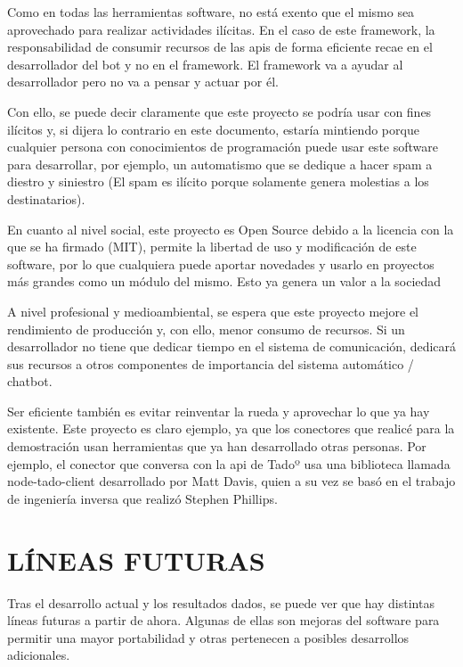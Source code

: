 \documentclass[spanish,12pt, a4paper, twoside]{paper}
\let\oldsection\section
\def\section{\cleardoublepage\oldsection}
\begin{document}
Como en todas las herramientas software, no está exento que el mismo sea aprovechado para realizar actividades ilícitas. En el caso de este framework, la responsabilidad de consumir recursos de las apis de forma eficiente recae en el desarrollador del bot y no en el framework. El framework va a ayudar al desarrollador pero no va a pensar y actuar por él.
\newline

Con ello, se puede decir claramente que este proyecto se podría usar con fines ilícitos y, si dijera lo contrario en este documento, estaría mintiendo porque cualquier persona con conocimientos de programación puede usar este software para desarrollar, por ejemplo, un automatismo que se dedique a hacer spam a diestro y siniestro (El spam es ilícito porque solamente genera molestias a los destinatarios).
\newline

En cuanto al nivel social, este proyecto es Open Source debido a la licencia con la que se ha firmado (MIT), permite la libertad de uso y modificación de este software, por lo que cualquiera puede aportar novedades y usarlo en proyectos más grandes como un módulo del mismo. Esto ya genera un valor a la sociedad

A nivel profesional y medioambiental, se espera que este proyecto mejore el rendimiento de producción y, con ello, menor consumo de recursos. Si un desarrollador no tiene que dedicar tiempo en el sistema de comunicación, dedicará sus recursos a otros componentes de importancia del sistema automático / chatbot.
\newline

Ser eficiente también es evitar reinventar la rueda y aprovechar lo que ya hay existente. Este proyecto es claro ejemplo, ya que los conectores que realicé para la demostración usan herramientas que ya han desarrollado otras personas. Por ejemplo, el conector que conversa con la api de Tadoº usa una biblioteca llamada node-tado-client desarrollado por Matt Davis, quien a su vez se basó en el trabajo de ingeniería inversa que realizó Stephen Phillips.

\section{LÍNEAS FUTURAS}

Tras el desarrollo actual y los resultados dados, se puede ver que hay distintas líneas futuras a partir de ahora. Algunas de ellas son mejoras del software para permitir una mayor portabilidad y otras pertenecen a posibles desarrollos adicionales.
\end{document}
